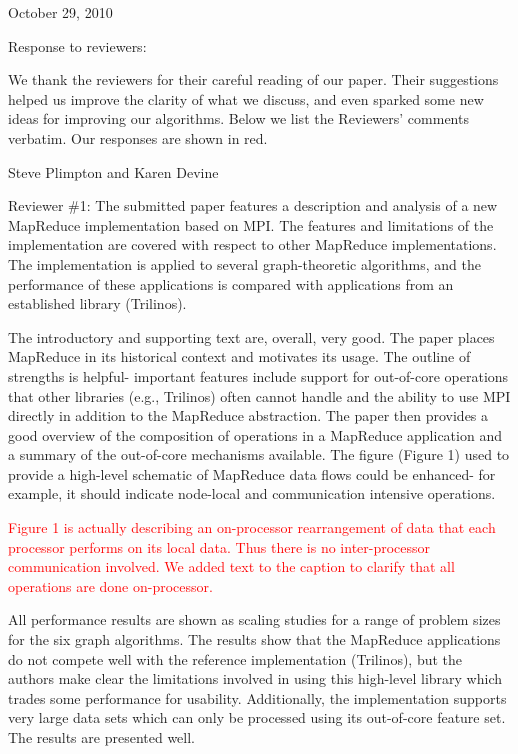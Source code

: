 \documentclass[11pt]{article}
\newcommand{\revise}[1]{\textcolor{red}{#1}}
\begin{document}
October 29, 2010

Response to reviewers:

We thank the reviewers for their careful reading of our paper.  Their
suggestions helped us improve the clarity of what we discuss, and even
sparked some new ideas for improving our algorithms.  Below we list
the Reviewers' comments verbatim.  Our responses are shown in red.

Steve Plimpton and Karen Devine

\vspace{0.5 in}

Reviewer \#1: The submitted paper features a description and analysis of a
new MapReduce implementation based on MPI.  The features and limitations
of the implementation are covered with respect to other MapReduce
implementations.  The implementation is applied to several
graph-theoretic algorithms, and the performance of these applications
is compared with applications from an established library (Trilinos).

The introductory and supporting text are, overall, very good.  The
paper places MapReduce in its historical context and motivates its
usage.  The outline of strengths is helpful- important features
include support for out-of-core operations that other libraries (e.g.,
Trilinos) often cannot handle and the ability to use MPI directly in
addition to the MapReduce abstraction.  The paper then provides a good
overview of the composition of operations in a MapReduce application
and a summary of the out-of-core mechanisms available.  The figure
(Figure 1) used to provide a high-level schematic of MapReduce data
flows could be enhanced- for example, it should indicate node-local
and communication intensive operations.

\revise{Figure 1 is actually describing an on-processor rearrangement
of data that each processor performs on its local data.  Thus there is
no inter-processor communication involved.  We added text to the caption
to clarify that all operations are done on-processor.}

All performance results are shown as scaling studies for a range of
problem sizes for the six graph algorithms.  The results show that the
MapReduce applications do not compete well with the reference
implementation (Trilinos), but the authors make clear the limitations
involved in using this high-level library which trades some
performance for usability.  Additionally, the implementation supports
very large data sets which can only be processed using its out-of-core
feature set.  The results are presented well.
\end{document}

